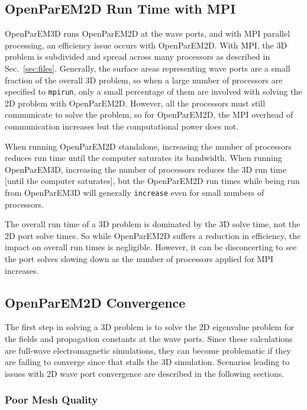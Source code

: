 \documentclass[titlepage]{article}
\renewcommand\_{\textunderscore\linebreak[1]}
\begin{document}
\subsection{OpenParEM2D Run Time with MPI}

OpenParEM3D runs OpenParEM2D at the wave ports, and with MPI parallel processing, an efficiency issue occurs with OpenParEM2D.  With MPI, the 3D problem is subdivided and spread across many processors as described in Sec.~\ref{sec:files}.  Generally, the surface areas representing wave ports are a small fraction of the overall 3D problem, so when a large number of processors are specified to \texttt{mpirun}, only a small percentage of them are involved with solving the 2D problem with OpenParEM2D.  However, all the processors must still communicate to solve the problem, so for OpenParEM2D, the MPI overhead of communication increases but the computational power does not. 

When running OpenParEM2D standalone, increasing the number of processors reduces run time until the computer saturates its bandwidth.  When running OpenParEM3D, increasing the number of processors reduces the 3D run time [until the computer saturates], but the OpenParEM2D run times while being run from OpenParEM3D will generally \texttt{increase} even for small numbers of processors.

The overall run time of a 3D problem is dominated by the 3D solve time, not the 2D port solve times.  So while OpenParEM2D suffers a reduction in efficiency, the impact on overall run times is negligible.  However, it can be disconcerting to see the port solves slowing down as the number of processors applied for MPI increases.

\subsection{OpenParEM2D Convergence}

The first step in solving a 3D problem is to solve the 2D eigenvalue problem for the fields and propagation constants at the wave ports.  Since these calculations are full-wave electromagnetic simulations, they can become problematic if they are failing to converge since that stalls the 3D simulation.  Scenarios leading to issues with 2D wave port convergence are described in the following sections.

\subsubsection{Poor Mesh Quality}
\end{document}
